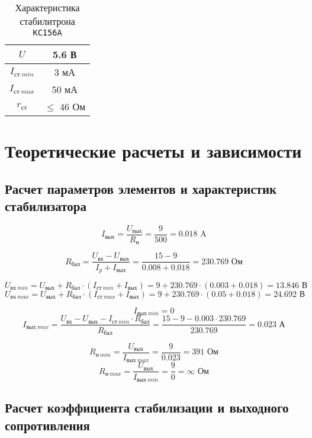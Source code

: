 \vspace{-0.5cm}

\begin{table}[H]
\begin{center}
	\caption{Характеристика стабилитрона \texttt{КС156А}}
	\def\tabcolsep{30pt}
	\begin{tabular}{|c|c|}
		\hline 
		$U$ & 5.6 В \\ 
		\hline 
		$I_{\text{ст}\ min}$ & 3 мА \\ 
		\hline 
		$I_{\text{ст}\ max}$ & 50 мА \\ 
		\hline 
		$r_{\text{ст}}$ & $\leq$ 46 Ом \\ 
		\hline 
	\end{tabular} 
\end{center}
\end{table}

\section{Теоретические расчеты и зависимости}

\subsection{Расчет параметров элементов и характеристик\\ стабилизатора}

\[
I_\text{вых} = \frac{U_\text{вых}}{R_\text{н}} = \frac{9}{500} = 0.018 \text{ A}
\]

\[
R_\text{бал} = \frac{U_\text{вх} - U_\text{вых}}{I_p + I_\text{вых}} = \frac{15 - 9}{0.008 + 0.018} = 230.769 \text{ Ом}
\]

\[
U_{\text{вх}\ min} = U_\text{вых} + R_\text{бал} \cdot (I_{\text{ст}\ min} + I_\text{вых}) = 9 + 230.769 \cdot (0.003 + 0.018) = 13.846 \text{ В}
\]
\[
U_{\text{вх}\ max} = U_\text{вых} + R_\text{бал} \cdot (I_{\text{ст}\ max} + I_\text{вых}) = 9 + 230.769 \cdot (0.05 + 0.018) = 24.692 \text{ В}
\]

\[
I_{\text{вых}\ min} = 0
\]
\[
I_{\text{вых}\ max} = \frac{U_\text{вх} - U_\text{вых} - I_{\text{ст}\ min} \cdot R_\text{бал}}{R_\text{бал}} = \frac{15 - 9 - 0.003 \cdot 230.769}{230.769} = 0.023 \text{ А}
\]

\[
R_{\text{н}\ min} = \frac{U_\text{вых}}{I_{\text{вых}\ max}} = \frac{9}{0.023} = 391 \text{ Ом}
\]
\[
R_{\text{н}\ max} = \frac{U_\text{вых}}{I_{\text{вых}\ min}} = \frac{9}{0} = \infty \text{ Ом}
\] 

\subsection{Расчет коэффициента стабилизации и выходного\\ сопротивления}

